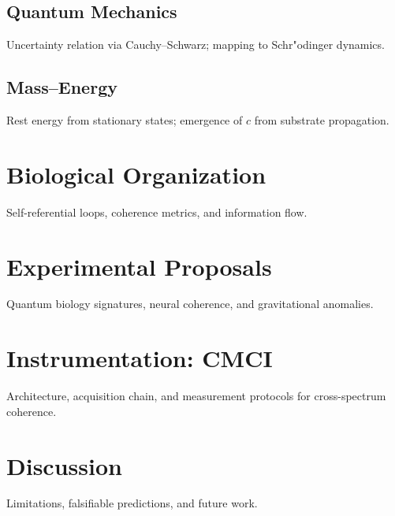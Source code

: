 \documentclass[12pt]{article}
\begin{document}
\subsection{Quantum Mechanics}
Uncertainty relation via Cauchy--Schwarz; mapping to Schr"odinger dynamics.
\subsection{Mass--Energy}
Rest energy from stationary states; emergence of $c$ from substrate propagation.

\section{Biological Organization}
Self-referential loops, coherence metrics, and information flow.

\section{Experimental Proposals}
Quantum biology signatures, neural coherence, and gravitational anomalies.

\section{Instrumentation: CMCI}
Architecture, acquisition chain, and measurement protocols for cross-spectrum coherence.

\section{Discussion}
Limitations, falsifiable predictions, and future work.

\printbibliography
\end{document}

